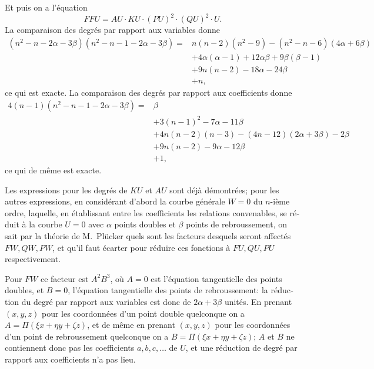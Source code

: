 \documentclass[11pt,a4paper]{article}
\begin{document}
\begin{otherlanguage}{french}
Et puis on a l'\'equation
\[
FFU = AU\cdot KU\cdot (PU)^{2}\cdot (QU)^{2}\cdot U.
\]
La comparaison des degr\'es par rapport aux variables donne
\[
\begin{aligned}
(n^{2} - n - 2\alpha - 3\beta)(n^{2} - n - 1 - 2\alpha - 3\beta) ={}& n(n - 2)(n^{2} - 9) - (n^{2} - n - 6)(4\alpha + 6\beta)\\
& + 4\alpha(\alpha - 1) + 12\alpha\beta + 9\beta(\beta - 1)\\
& + 9n(n - 2) - 18\alpha - 24\beta\\
& + n,
\end{aligned}
\]
ce qui est exacte. La comparaison des degr\'es par rapport aux coefficients donne
\[
\begin{aligned}
4(n - 1)(n^{2} - n - 1 - 2\alpha - 3\beta) ={}& \beta\\
& + 3(n - 1)^{2} - 7\alpha - 11\beta\\
& + 4n(n - 2)(n - 3) - (4n - 12)(2\alpha + 3\beta) - 2\beta\\
& + 9n(n - 2) - 9\alpha - 12\beta\\
& + 1,
\end{aligned}
\]
ce qui de m\^eme est exacte.

Les expressions pour les degr\'es de $KU$ et $AU$ sont d\'ej\`a d\'emontr\'ees; pour les autres expressions, en consid\'erant d'abord la courbe g\'en\'erale $W = 0$ du $n$-i\`eme ordre, laquelle, en \'etablissant entre les coefficients les relations convenables, se r\'eduit \`a la courbe $U = 0$ avec $\alpha$ points doubles et $\beta$ points de rebroussement, on sait par la th\'eorie de M.~Pl\"ucker quels sont les facteurs desquels seront affect\'es $FW, QW, PW$, et qu'il faut \'ecarter pour r\'eduire ces fonctions \`a $FU, QU, PU$ respectivement.

Pour $FW$ ce facteur est $A^{2}B^{3}$, o\`u $A = 0$ est l'\'equation tangentielle des points doubles, et $B = 0$, l'\'equation tangentielle des points de rebroussement: la r\'eduction du degr\'e par rapport aux variables est donc de $2\alpha + 3\beta$ unit\'es. En prenant $(x, y, z)$ pour les coordonn\'ees d'un point double quelconque on a $A = \Pi(\xi x + \eta y + \zeta z)$, et de m\^eme en prenant $(x, y, z)$ pour les coordonn\'ees d'un point de rebroussement quelconque on a $B = \Pi(\xi x + \eta y + \zeta z)$; $A$ et $B$ ne contiennent donc pas les coefficients $a, b, c, \ldots$ de $U$, et une r\'eduction de degr\'e par rapport aux coefficients n'a pas lieu.


\end{otherlanguage}
\end{document}
